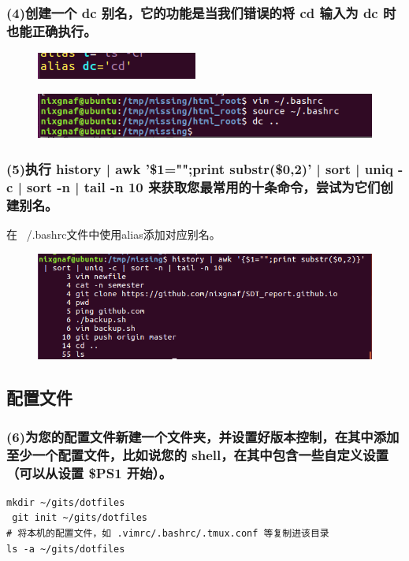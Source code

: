 \documentclass{article}
\begin{document}
\subsubsection{(4)创建一个 dc 别名，它的功能是当我们错误的将 cd 输入为 dc 时也能正确执行。}
\begin{figure}[h]
    \centering
    \includegraphics[width=0.75\linewidth]{image4.png}
\end{figure}
\begin{figure}[h]
    \centering
    \includegraphics[width=0.75\linewidth]{image5.png}
\end{figure}

\subsubsection{(5)执行 history | awk '{\$1="";print substr(\$0,2)}' | sort | uniq -c | sort -n | tail -n 10 来获取您最常用的十条命令，尝试为它们创建别名。}
\noindent 在 ~/.bashrc文件中使用alias添加对应别名。
\begin{figure}[h]
    \centering
    \includegraphics[width=0.75\linewidth]{image6.png}
\end{figure}

\subsection{配置文件}

\subsubsection{(6)为您的配置文件新建一个文件夹，并设置好版本控制，在其中添加至少一个配置文件，比如说您的 shell，在其中包含一些自定义设置（可以从设置 \$PS1 开始）。}
\begin{lstlisting}[style=myStyle]
 mkdir ~/gits/dotfiles
 git init ~/gits/dotfiles
# 将本机的配置文件，如 .vimrc/.bashrc/.tmux.conf 等复制进该目录
ls -a ~/gits/dotfiles
\end{lstlisting}
\end{document}
